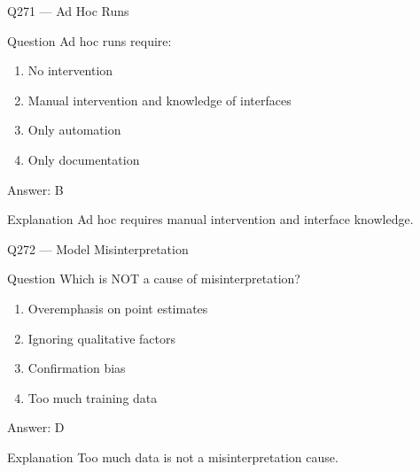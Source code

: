 \documentclass[aspectratio=169,8pt]{beamer}
\begin{document}
								\begin{frame}{Q271 --- Ad Hoc Runs}
									\begin{block}{Question}
										Ad hoc runs require:
										\begin{enumerate}
											\item No intervention
											\item Manual intervention and knowledge of interfaces
											\item Only automation
											\item Only documentation
										\end{enumerate}
									\end{block}
									\begin{exampleblock}{Answer: B}\end{exampleblock}
									\begin{block}{Explanation}
										Ad hoc requires manual intervention and interface knowledge.
									\end{block}
								\end{frame}
								
								\begin{frame}{Q272 --- Model Misinterpretation}
									\begin{block}{Question}
										Which is NOT a cause of misinterpretation?
										\begin{enumerate}
											\item Overemphasis on point estimates
											\item Ignoring qualitative factors
											\item Confirmation bias
											\item Too much training data
										\end{enumerate}
									\end{block}
									\begin{exampleblock}{Answer: D}\end{exampleblock}
									\begin{block}{Explanation}
										Too much data is not a misinterpretation cause.
									\end{block}
								\end{frame}
								
\end{document}
